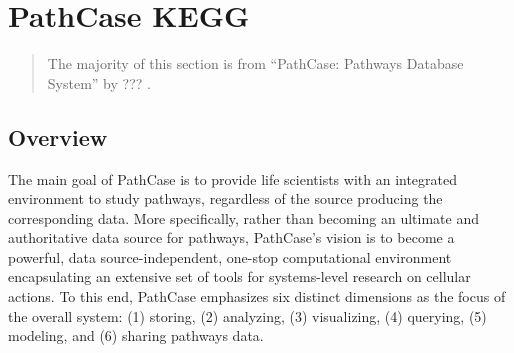 \section{PathCase KEGG}
\label{sect:pathcase_kegg}

\begin{verse}
    The majority of this section is from ``PathCase: Pathways Database System''
    by ??? \cite{???}.
\end{verse}

\subsection{Overview}
\label{sect:pathcase_overview}

The main goal of PathCase is to provide life scientists with an integrated
environment to study pathways, regardless of the source producing the
corresponding data. More specifically, rather than becoming an ultimate and
authoritative data source for pathways, PathCase’s vision is to become a
powerful, data source-independent, one-stop computational environment
encapsulating an extensive set of tools for systems-level research on cellular
actions. To this end, PathCase emphasizes six distinct dimensions as the focus
of the overall system: (1) storing, (2) analyzing, (3) visualizing, (4)
querying, (5) modeling, and (6) sharing pathways data.


